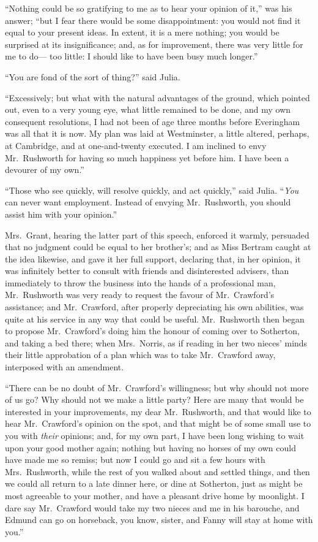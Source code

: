 ``Nothing could be so gratifying to me as to hear your
opinion of it,'' was his answer; ``but I fear there would
be some disappointment:  you would not find it equal
to your present ideas.  In extent, it is a mere nothing;
you would be surprised at its insignificance; and,
as for improvement, there was very little for me to do---%
too little:  I should like to have been busy much longer.''

``You are fond of the sort of thing?'' said Julia.

``Excessively; but what with the natural advantages of
the ground, which pointed out, even to a very young eye,
what little remained to be done, and my own consequent
resolutions, I had not been of age three months before
Everingham was all that it is now.  My plan was laid
at Westminster, a little altered, perhaps, at Cambridge,
and at one-and-twenty executed.  I am inclined to envy
Mr.\ Rushworth for having so much happiness yet before him.
I have been a devourer of my own.''

``Those who see quickly, will resolve quickly, and act quickly,''
said Julia.  ``\emph{You} can never want employment.
Instead of envying Mr.\ Rushworth, you should assist
him with your opinion.''

Mrs.\ Grant, hearing the latter part of this speech,
enforced it warmly, persuaded that no judgment could
be equal to her brother's; and as Miss Bertram caught
at the idea likewise, and gave it her full support,
declaring that, in her opinion, it was infinitely better
to consult with friends and disinterested advisers,
than immediately to throw the business into the hands of a
professional man, Mr.\ Rushworth was very ready to request
the favour of Mr.\ Crawford's assistance; and Mr.\ Crawford,
after properly depreciating his own abilities, was quite at
his service in any way that could be useful.  Mr.\ Rushworth
then began to propose Mr.\ Crawford's doing him the honour
of coming over to Sotherton, and taking a bed there;
when Mrs.\ Norris, as if reading in her two nieces'
minds their little approbation of a plan which was to take
Mr.\ Crawford away, interposed with an amendment.

``There can be no doubt of Mr.\ Crawford's willingness;
but why should not more of us go?  Why should not we
make a little party?  Here are many that would be
interested in your improvements, my dear Mr.\ Rushworth,
and that would like to hear Mr.\ Crawford's opinion on
the spot, and that might be of some small use to you with
\emph{their} opinions; and, for my own part, I have been long
wishing to wait upon your good mother again; nothing but
having no horses of my own could have made me so remiss;
but now I could go and sit a few hours with Mrs.\ Rushworth,
while the rest of you walked about and settled things,
and then we could all return to a late dinner here,
or dine at Sotherton, just as might be most agreeable to
your mother, and have a pleasant drive home by moonlight.
I dare say Mr.\ Crawford would take my two nieces and me
in his barouche, and Edmund can go on horseback, you know,
sister, and Fanny will stay at home with you.''

